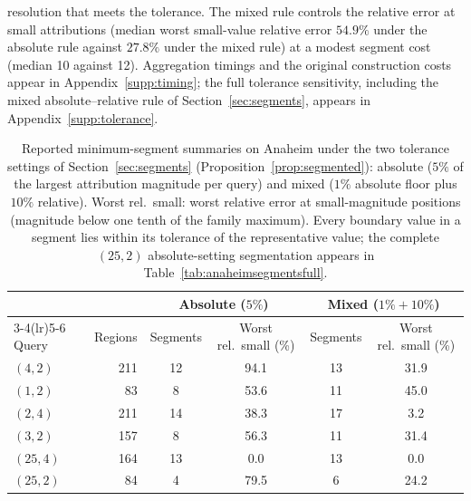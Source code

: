 resolution that meets the tolerance. The mixed rule controls the
relative error at small attributions (median worst small-value relative
error $54.9\%$ under the absolute rule against $27.8\%$ under the
mixed rule) at a modest segment cost (median 10 against 12).
Aggregation timings and the original construction costs appear in
Appendix~\ref{supp:timing}; the full tolerance sensitivity, including
the mixed absolute--relative rule of Section~\ref{sec:segments},
appears in Appendix~\ref{supp:tolerance}.
\begin{table}[t]\centering\footnotesize
\caption{Reported minimum-segment summaries on Anaheim under the two
tolerance settings of Section~\ref{sec:segments}
(Proposition~\ref{prop:segmented}): absolute ($5\%$ of the largest
attribution magnitude per query) and mixed ($1\%$ absolute floor
plus $10\%$ relative). Worst rel.\ small: worst relative error at
small-magnitude positions (magnitude below one tenth of the family
maximum). Every boundary value in a segment lies
within its tolerance of the representative value; the complete $(25,2)$
absolute-setting segmentation appears in
Table~\ref{tab:anaheimsegmentsfull}.}\label{tab:anaheimsegments}
\setlength{\tabcolsep}{4pt}
\begin{tabular*}{\tblwidth}{@{\extracolsep{\fill}}lrcccc}
\toprule
 & & \multicolumn{2}{c}{Absolute ($5\%$)} & \multicolumn{2}{c}{Mixed ($1\%{+}10\%$)}\\
\cmidrule(lr){3-4}\cmidrule(lr){5-6}
Query & Regions & Segments & Worst rel.\ small (\%) & Segments & Worst rel.\ small (\%)\\
\midrule
$(4,2)$ & 211 & 12 & 94.1 & 13 & 31.9\\
$(1,2)$ & 83 & 8 & 53.6 & 11 & 45.0\\
$(2,4)$ & 211 & 14 & 38.3 & 17 & 3.2\\
$(3,2)$ & 157 & 8 & 56.3 & 11 & 31.4\\
$(25,4)$ & 164 & 13 & 0.0 & 13 & 0.0\\
$(25,2)$ & 84 & 4 & 79.5 & 6 & 24.2\\
\bottomrule\end{tabular*}\end{table}
